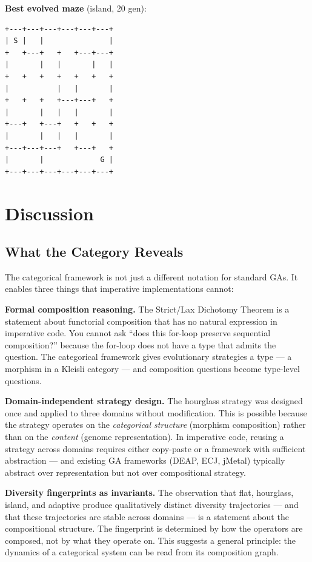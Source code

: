 \documentclass[10pt]{article}
\begin{document}
\textbf{Best evolved maze} (island, 20 gen):
\begin{verbatim}
+---+---+---+---+---+---+
| S |   |               |
+   +---+   +   +---+---+
|       |   |       |   |
+   +   +   +   +   +   +
|           |   |       |
+   +   +   +---+---+   +
|       |   |   |       |
+---+   +---+   +   +   +
|       |   |   |       |
+---+---+---+   +---+   +
|       |             G |
+---+---+---+---+---+---+
\end{verbatim}

\section{Discussion}

\subsection{What the Category Reveals}

The categorical framework is not just a different notation for standard GAs. It enables three things that imperative implementations cannot:

\textbf{Formal composition reasoning.} The Strict/Lax Dichotomy Theorem is a statement about functorial composition that has no natural expression in imperative code. You cannot ask ``does this for-loop preserve sequential composition?'' because the for-loop does not have a type that admits the question. The categorical framework gives evolutionary strategies a type --- a morphism in a Kleisli category --- and composition questions become type-level questions.

\textbf{Domain-independent strategy design.} The hourglass strategy was designed once and applied to three domains without modification. This is possible because the strategy operates on the \emph{categorical structure} (morphism composition) rather than on the \emph{content} (genome representation). In imperative code, reusing a strategy across domains requires either copy-paste or a framework with sufficient abstraction --- and existing GA frameworks (DEAP, ECJ, jMetal) typically abstract over representation but not over compositional strategy.

\textbf{Diversity fingerprints as invariants.} The observation that flat, hourglass, island, and adaptive produce qualitatively distinct diversity trajectories --- and that these trajectories are stable across domains --- is a statement about the compositional structure. The fingerprint is determined by how the operators are composed, not by what they operate on. This suggests a general principle: the dynamics of a categorical system can be read from its composition graph.
\end{document}
